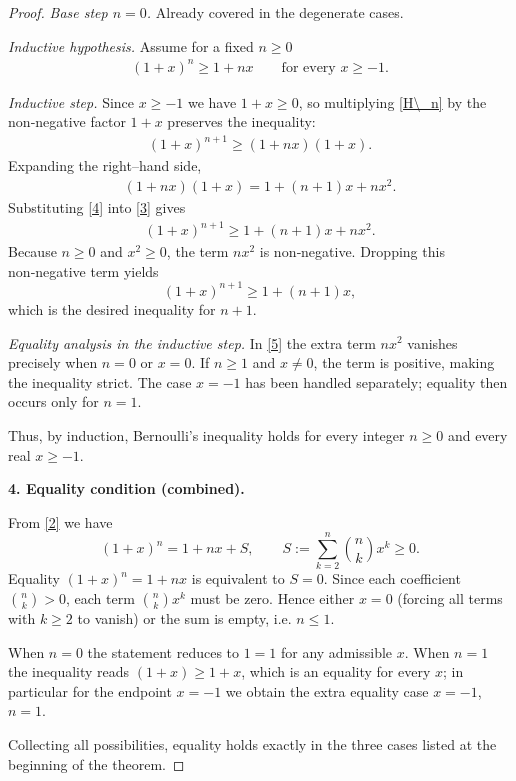 \begin{proof}
\emph{Base step $n=0$.}  Already covered in the degenerate cases.

\emph{Inductive hypothesis.}  Assume for a fixed $n\ge0$
\begin{align}
(1+x)^{n}\ge 1+nx \qquad\text{for every }x\ge-1 .
\tag{H\_n}
\end{align}

\emph{Inductive step.}  Since $x\ge-1$ we have $1+x\ge0$, so multiplying \eqref{H\_n} by the non‑negative factor $1+x$ preserves the inequality:
\begin{align}
(1+x)^{n+1}\ge (1+nx)(1+x).
\tag{3}
\end{align}
Expanding the right–hand side,
\begin{align}
(1+nx)(1+x)=1+(n+1)x+nx^{2}.
\tag{4}
\end{align}
Substituting \eqref{4} into \eqref{3} gives
\begin{align}
(1+x)^{n+1}\ge 1+(n+1)x+nx^{2}.
\tag{5}
\end{align}
Because $n\ge0$ and $x^{2}\ge0$, the term $nx^{2}$ is non‑negative. Dropping this non‑negative term yields
\[
(1+x)^{n+1}\ge 1+(n+1)x ,
\]
which is the desired inequality for $n+1$.  

\emph{Equality analysis in the inductive step.}  In \eqref{5} the extra term $nx^{2}$ vanishes precisely when $n=0$ or $x=0$. If $n\ge1$ and $x\neq0$, the term is positive, making the inequality strict. The case $x=-1$ has been handled separately; equality then occurs only for $n=1$.

Thus, by induction, Bernoulli’s inequality holds for every integer $n\ge0$ and every real $x\ge-1$.

\medskip

\textbf{4. Equality condition (combined).}  

From \eqref{2} we have
\[
(1+x)^{n}=1+nx+S,\qquad
S:=\sum_{k=2}^{n}\binom{n}{k}x^{k}\ge0 .
\]
Equality $(1+x)^{n}=1+nx$ is equivalent to $S=0$. Since each coefficient $\binom{n}{k}>0$, each term $\binom{n}{k}x^{k}$ must be zero. Hence either $x=0$ (forcing all terms with $k\ge2$ to vanish) or the sum is empty, i.e. $n\le1$.  

When $n=0$ the statement reduces to $1=1$ for any admissible $x$.  
When $n=1$ the inequality reads $(1+x)\ge1+x$, which is an equality for every $x$; in particular for the endpoint $x=-1$ we obtain the extra equality case $x=-1$, $n=1$.

Collecting all possibilities, equality holds exactly in the three cases listed at the beginning of the theorem.

\end{proof}